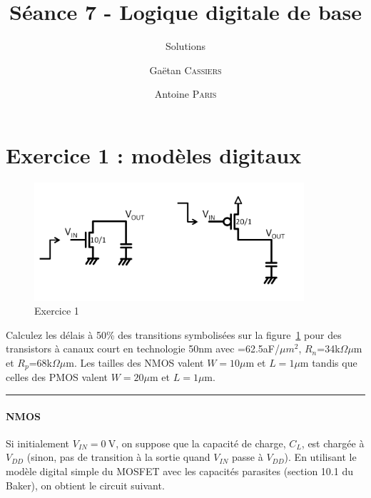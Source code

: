 \documentclass[frenchb,DIV=14]{scrartcl}
\title{Séance 7 - Logique digitale de base}
\subtitle{Solutions}
\author{\small Gaëtan \textsc{Cassiers} \and\small Antoine \textsc{Paris}}
\date{}
\begin{document}
\maketitle

\section*{Exercice 1 : modèles digitaux}

\begin{figure}[!htbp]
   	\centering
   	\includegraphics[width=10cm]{figures/fig7-1.png}
   	\caption{Exercice 1}
   	\label{fig7-1}
\end{figure}

Calculez les délais à 50\% des transitions symbolisées sur la figure~\ref{fig7-1}
pour des transistors à canaux court en technologie 50nm avec \cox=62.5aF/$\mu m^2$,
$R_n$=34k$\Omega\mu$m et $R_p$=68k$\Omega\mu$m.
Les tailles des NMOS valent $W=10\mu$m et $L=1\mu$m tandis que celles des PMOS valent
$W=20\mu$m et $L=1\mu$m.

\hspace{1cm}\hrule

\paragraph{NMOS}
Si initialement $V_{IN} = \SI{0}{\volt}$, on suppose que la capacité de charge,
$C_L$, est chargée à $V_{DD}$ (sinon, pas de transition à la sortie quand $V_{IN}$
passe à $V_{DD}$). En utilisant le modèle digital simple du MOSFET avec les
capacités parasites (section 10.1 du Baker), on obtient le circuit suivant.

\begin{center}
\end{center}
\end{document}
